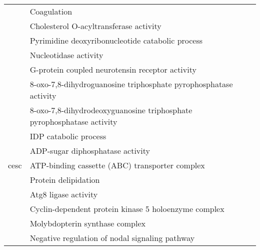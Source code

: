 \begin{appendices}
\begin{longtable}{lp{}}
                                 & Coagulation                                                                                     \\
                                 & Cholesterol O-acyltransferase activity                                                          \\
                                 & Pyrimidine deoxyribonucleotide catabolic process                                                \\
                                 & Nucleotidase activity                                                                           \\
                                 & G-protein coupled neurotensin receptor activity                                                 \\
                                 & 8-oxo-7,8-dihydroguanosine triphosphate pyrophosphatase activity                                \\
                                 & 8-oxo-7,8-dihydrodeoxyguanosine triphosphate pyrophosphatase activity                           \\
                                 & IDP catabolic process                                                                           \\
                                 & ADP-sugar diphosphatase activity                                                                \\
	\hline
	\gls{cesc}                   & ATP-binding cassette (ABC) transporter complex                                                  \\
                                 & Protein delipidation                                                                            \\
                                 & Atg8 ligase activity                                                                            \\
                                 & Cyclin-dependent protein kinase 5 holoenzyme complex                                            \\
                                 & Molybdopterin synthase complex                                                                  \\
                                 & Negative regulation of nodal signaling pathway                                                  \\

\end{longtable}
\end{appendices}
